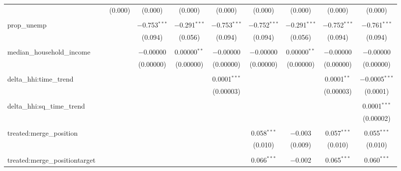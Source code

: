 \begin{table}[H]
{\begin{tabular}{@{\extracolsep{5pt}}lccccccccc}
   &  & (0.000) & (0.000) & (0.000) & (0.000) & (0.000) & (0.000) & (0.000) & (0.000) \\  

   & & & & & & & & & \\  

  prop\_unemp &  &  & $-$0.753$^{***}$ & $-$0.291$^{***}$ & $-$0.753$^{***}$ & $-$0.752$^{***}$ & $-$0.291$^{***}$ & $-$0.752$^{***}$ & $-$0.761$^{***}$ \\  

   &  &  & (0.094) & (0.056) & (0.094) & (0.094) & (0.056) & (0.094) & (0.094) \\  

   & & & & & & & & & \\  

  median\_household\_income &  &  & $-$0.00000 & 0.00000$^{**}$ & $-$0.00000 & $-$0.00000 & 0.00000$^{**}$ & $-$0.00000 & $-$0.00000 \\  

   &  &  & (0.00000) & (0.00000) & (0.00000) & (0.00000) & (0.00000) & (0.00000) & (0.00000) \\  

   & & & & & & & & & \\  

  delta\_hhi:time\_trend &  &  &  &  & 0.0001$^{***}$ &  &  & 0.0001$^{**}$ & $-$0.0005$^{***}$ \\  

   &  &  &  &  & (0.00003) &  &  & (0.00003) & (0.0001) \\  

   & & & & & & & & & \\  

  delta\_hhi:sq\_time\_trend &  &  &  &  &  &  &  &  & 0.0001$^{***}$ \\  

   &  &  &  &  &  &  &  &  & (0.00002) \\  

   & & & & & & & & & \\  

  treated:merge\_position &  &  &  &  &  & 0.058$^{***}$ & $-$0.003 & 0.057$^{***}$ & 0.055$^{***}$ \\  

   &  &  &  &  &  & (0.010) & (0.009) & (0.010) & (0.010) \\  

   & & & & & & & & & \\  

  treated:merge\_positiontarget &  &  &  &  &  & 0.066$^{***}$ & $-$0.002 & 0.065$^{***}$ & 0.060$^{***}$ \\  


\end{tabular}}
\end{table}
